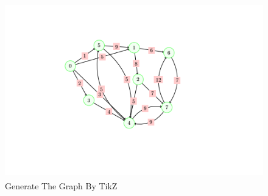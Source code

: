 \documentclass[a4paper,10pt]{article}
\begin{document}
\paragraph{}
\begin{figure}[H]
		\centering
		\includegraphics[height = 3in]{tikz_graph_image.png}
		\caption[Optional caption]{Generate The Graph By TikZ}
		\label{fig:Repository}
	\end{figure}
\paragraph{}
\newpage
{}
\printbibliography
\end{document}
